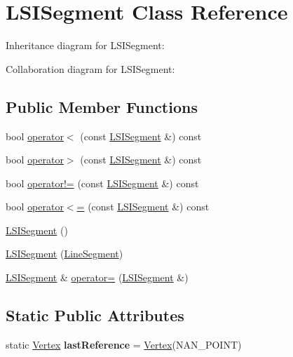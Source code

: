 \hypertarget{classLSISegment}{}\section{L\+S\+I\+Segment Class Reference}
\label{classLSISegment}


Inheritance diagram for L\+S\+I\+Segment\+:


Collaboration diagram for L\+S\+I\+Segment\+:
\subsection*{Public Member Functions}
\begin{DoxyCompactItemize}
\item 
bool \hyperlink{classLSISegment_a53f18d8b321d0d7aece853a24f2637ea}{operator$<$} (const \hyperlink{classLSISegment}{L\+S\+I\+Segment} \&) const
\item 
bool \hyperlink{classLSISegment_ab7f8a0337938cdae39bf0cc87c4b2263}{operator$>$} (const \hyperlink{classLSISegment}{L\+S\+I\+Segment} \&) const
\item 
bool \hyperlink{classLSISegment_a4b1b4e97bad7eb4020bab8d97e23fb5f}{operator!=} (const \hyperlink{classLSISegment}{L\+S\+I\+Segment} \&) const
\item 
bool \hyperlink{classLSISegment_a0e1d3dcc1b5ab0d446aa5f5a37891b95}{operator$<$=} (const \hyperlink{classLSISegment}{L\+S\+I\+Segment} \&) const
\item 
\hyperlink{classLSISegment_a7b0e2c3b0a9cd8b840d0b620d03f4633}{L\+S\+I\+Segment} ()
\item 
\hyperlink{classLSISegment_a12f1e7e572b0aaaa58db38ef67ea0801}{L\+S\+I\+Segment} (\hyperlink{classLineSegment}{Line\+Segment})
\item 
\hyperlink{classLSISegment}{L\+S\+I\+Segment} \& \hyperlink{classLSISegment_a9be3a8f945027dc24121e168bd21012d}{operator=} (\hyperlink{classLSISegment}{L\+S\+I\+Segment} \&)
\end{DoxyCompactItemize}
\subsection*{Static Public Attributes}
\begin{DoxyCompactItemize}
\item 
\mbox{\label{classLSISegment_a443fcbea369f7dc016c7a2dd142116ea}} 
static \hyperlink{classVertex}{Vertex} {\bfseries last\+Reference} = \hyperlink{classVertex}{Vertex}(N\+A\+N\+\_\+\+P\+O\+I\+NT)
\end{DoxyCompactItemize}
